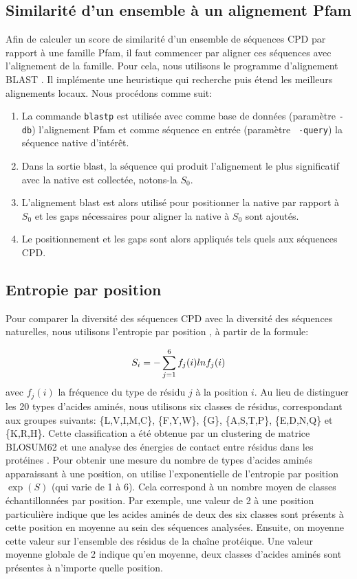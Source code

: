\subsection{Similarité d'un ensemble à un alignement Pfam}
\label{SimPfam}
Afin de calculer un score de similarité d'un ensemble de séquences CPD par rapport à une famille Pfam, il faut commencer par aligner ces séquences avec l'alignement de la famille. Pour cela, nous utilisons le programme d'alignement BLAST \cite{Altschul97,Camacho08}. Il implémente une heuristique qui recherche puis étend les meilleurs alignements locaux. Nous procédons comme suit:
\begin{enumerate}[leftmargin=*]
\item La commande \verb!blastp! est utilisée avec comme base de données (paramètre \verb!-db!) l'alignement Pfam et comme séquence en entrée (paramètre \verb! -query!) la séquence native d'intérêt. 
\item Dans la sortie blast, la séquence qui produit l'alignement le plus significatif avec la native est collectée, notons-la $S_0$. 
\item L'alignement blast est alors utilisé pour positionner la native par rapport à $S_0$ et les gaps nécessaires pour aligner la native à $S_0$ sont ajoutés.
\item Le positionnement et les gaps sont alors appliqués tels quels aux séquences CPD.

\end{enumerate}

\subsection{Entropie par position}
\label{sec:Entropie}
Pour comparer la diversité des séquences CPD avec la diversité des séquences naturelles, nous utilisons l'entropie par position \cite{Durbin02}, à partir de la formule:

\begin{equation} \label{eq:entropy}
  S_i = - \sum_{j=1}^6 f_j(i)lnf_j(i) \\
\end{equation} 
avec $f_j(i)$ la fréquence du type de résidu $j$ à la position $i$. Au lieu de distinguer les 20 types d'acides aminés, nous utilisons six classes de résidus, correspondant aux groupes suivants: \{L,V,I,M,C\}, \{F,Y,W\}, \{G\}, \{A,S,T,P\}, \{E,D,N,Q\} et \{K,R,H\}. Cette classification a été obtenue par un clustering de matrice BLOSUM62 et une analyse  des énergies de contact entre résidus dans les protéines \cite{Launay07}. Pour obtenir une mesure du nombre de types d'acides aminés apparaissant à une position, on utilise l'exponentielle de l'entropie par position $\exp(S)$ (qui varie de 1 à 6).  Cela correspond à un nombre moyen de classes échantillonnées par position. Par exemple, une valeur de 2 à une position particulière indique que les acides aminés de deux des six classes sont présents à cette position en moyenne au sein des séquences analysées. Ensuite, on moyenne cette valeur sur l'ensemble des résidus de la chaîne protéique. Une valeur moyenne globale de 2 indique qu'en moyenne, deux classes d'acides aminés sont présentes à n'importe quelle position.


\clearpage



